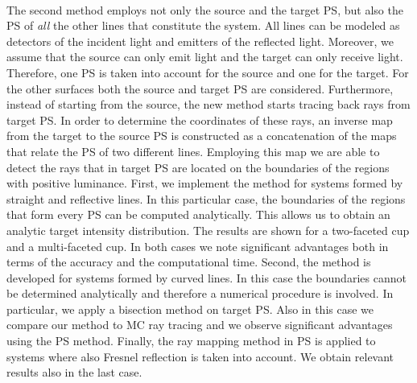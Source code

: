 \\ \indent The second method employs not only the source and the target PS, but also the PS of \textit{all} the other lines that constitute the system.
All lines can be modeled as detectors of the incident light and emitters of the reflected light.
Moreover, we assume that the source can only emit light and the target can only receive light.
Therefore, one PS is taken into account for the source and one for the target. For the other surfaces both the source and target PS are considered.
Furthermore, instead of starting from the source, the new method starts tracing back rays from target PS. 
In order to determine the coordinates of these rays, an inverse map from the target to the source PS is constructed as a concatenation of the maps that relate the PS of two different lines.
Employing this map we are able to detect the rays that in target PS are located on the boundaries of the regions with positive luminance. 
First, we implement the method for systems formed by straight and reflective lines. In this particular case, the boundaries of the regions that form every PS can be computed analytically. This allows us to obtain an analytic target intensity distribution. The results are shown for a two-faceted cup and a multi-faceted cup. In both cases we note significant advantages both in terms of the accuracy and the computational time. Second, the method is developed for systems formed by curved lines. In this case the boundaries cannot be determined analytically and therefore a numerical procedure is involved. In particular, we apply a bisection method on target PS. Also in this case we compare our method to MC ray tracing and we observe significant advantages using the PS method. Finally, the ray mapping method in PS is applied to systems where also Fresnel reflection is taken into account. We obtain relevant results also in the last case.